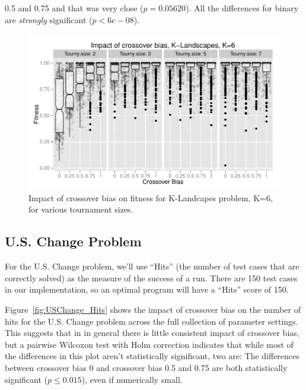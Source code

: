 \documentclass{sig-alternate}
\begin{document}
0.5 and 0.75 and that was very close ($p=0.05620$). All the differences for binary are \emph{strongly} significant 
($p<6e-08$).

\begin{figure}
\centering
\includegraphics[width=0.45 \textwidth]{Plots/KLandscapes6_XO_bias_impact_facets.pdf}
\caption{Impact of crossover bias on fitness for K-Landcapes problem, K=6, for various tournament sizes.}
\label{fig:KLandscapes6_XO_bias_impact_facets}
\end{figure}

%
%
%
%

\subsection{U.S. Change Problem}

For the U.S. Change problem, we'll use ``Hits'' (the number of test cases that are correctly solved) as the measure of 
the success of a run. There are 150 test cases in our implementation, so an optimal program will have a ``Hits'' score 
of 150.

Figure~\ref{fig:USChange_Hits} shows the impact of crossover bias on the number of hits for the U.S. Change 
problem across the full collection of parameter settings. This suggests that in in general there is little consistent 
impact of crossover bias, but a pairwise Wilcoxon test with Holm correction indicates that while most of the 
differences in this plot aren't statistically significant, two are: The differences between crossover bias 0 and crossover 
bias 0.5 and 0.75 are both statistically significant ($p \leq 0.015$), even if numerically small.
\end{document}

